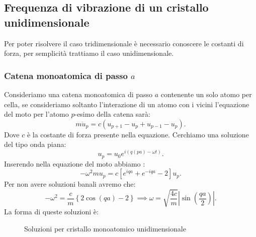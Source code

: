 \subsection{Frequenza di vibrazione di un cristallo unidimensionale}
\label{subsec:Frequenza di vibrazione di un cristallo unidimensionale}
Per poter risolvere il caso tridimensionale è necessario conoscere le costanti di forza, per semplicità trattiamo il caso unidimensionale.
\subsubsection{Catena monoatomica di passo $a$}
\label{subsec:Catena monoatomica di passo $a$}
Consideriamo una catena monoatomica di passo $a$ contenente un solo atomo per cella, se consideriamo soltanto l'interazione di un atomo con i vicini l'equazione del moto per l'atomo $p$-esimo della catena sarà:
\[
	m \ddot{u}_p 
	=
	c\left( u_{p+1} -u_{p} + u_{p-1} - u_{p} \right) 
.\] 
Dove $c$ è la costante di forza presente nella equazione.
Cerchiamo una soluzione del tipo onda piana:
\[
	u_p = u_0 e^{i\left( q \left( pa \right)  -\omega t \right) }
.\] 
Inserendo nella equazione del moto abbiamo :
\[
	-\omega ^2 m u_p 
	=
	c\left[ e^{iqa} + e^{-iqa} - 2 \right] u_p
.\] 
Per non avere soluzioni banali avremo che:
\[
	-\omega ^2 = \frac{c}{m}\left\{ 2\cos(qa) - 2 \right\} 
	\implies
	\omega  = \sqrt{\frac{4c}{m}} \left| \sin\left( \frac{qa}{2} \right)  \right| 
.\] 
La forma di queste soluzioni è:
\begin{figure}[H]
    \centering
    \caption{Soluzioni per cristallo monoatomico unidimensionale}
    \label{fig:soluzioni-per-cristallo-monoatomico-unidimensionale}
\end{figure}
\noindent
